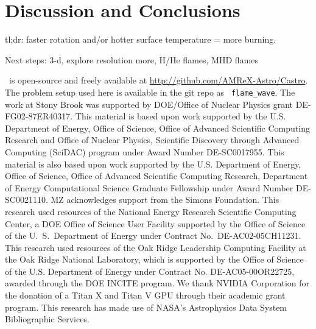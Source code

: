 \documentclass[preprint,times,tighten]{aastex63}
\newcommand{\castro}{{\sf Castro}}
\begin{document}
\section{Discussion and Conclusions}\label{Sec:conclusions}

tl;dr: faster rotation and/or hotter surface temperature = more burning.

Next steps: 3-d, explore resolution more, H/He flames, MHD flames


\acknowledgments \castro\ is open-source and freely available at
\url{http://github.com/AMReX-Astro/Castro}.  The problem setup used
here is available in the git repo as {\tt
  flame\_wave}.  The work at Stony Brook was supported by DOE/Office
of Nuclear Physics grant DE-FG02-87ER40317.  This material is based upon work supported by the
U.S. Department of Energy, Office of Science, Office of Advanced
Scientific Computing Research and Office of Nuclear Physics, Scientific
Discovery through Advanced Computing (SciDAC) program under Award
Number DE-SC0017955.  This material is also based upon work supported by the U.S. Department
of Energy, Office of Science, Office of Advanced Scientific Computing Research, Department of
Energy Computational Science Graduate Fellowship under Award Number DE-SC0021110.
MZ acknowledges support from the Simons Foundation. 
This research used resources of the National Energy
Research Scientific Computing Center, a DOE Office of Science User
Facility supported by the Office of Science of the U.~S.\ Department
of Energy under Contract No.\ DE-AC02-05CH11231.  This research used
resources of the Oak Ridge Leadership Computing Facility at the Oak
Ridge National Laboratory, which is supported by the Office of Science
of the U.S. Department of Energy under Contract No. DE-AC05-00OR22725,
awarded through the DOE INCITE program.  We thank NVIDIA Corporation
for the donation of a Titan X and Titan V GPU through their academic
grant program.  This research has made use of NASA's Astrophysics Data
System Bibliographic Services.








\end{document}
